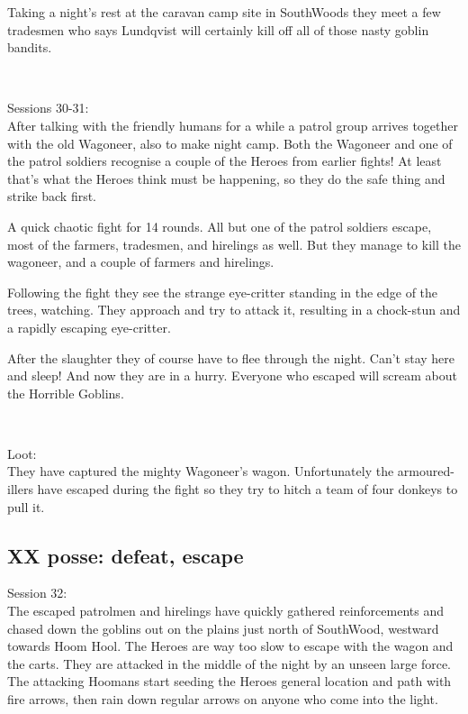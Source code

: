 Taking a night's rest at the caravan camp site in SouthWoods they meet a few tradesmen who says Lundqvist will certainly kill off all of those nasty goblin bandits.

\


Sessions 30-31:\\
After talking with the friendly humans for a while a patrol group arrives together with the old Wagoneer, also to make night camp. Both the Wagoneer and one of the patrol soldiers recognise a couple of the Heroes from earlier fights! At least that's what the Heroes think must be happening, so they do the safe thing and strike back first.

A quick chaotic fight for 14 rounds. All but one of the patrol soldiers escape, most of the farmers, tradesmen, and hirelings as well. But they manage to kill the wagoneer, and a couple of farmers and hirelings.

Following the fight they see the strange eye-critter standing in the edge of the trees, watching. They approach and try to attack it, resulting in a chock-stun and a rapidly escaping eye-critter.

After the slaughter they of course have to flee through the night. Can't stay here and sleep! And now they are in a hurry. Everyone who escaped will scream about the Horrible Goblins.

\

Loot:\\
They have captured the mighty Wagoneer's wagon. Unfortunately the armoured-illers have escaped during the fight so they try to hitch a team of four donkeys to pull it.


\subsection*{XX posse: defeat, escape}

\forceindent Session 32:\\                                              %
The escaped patrolmen and hirelings have quickly gathered reinforcements and chased down the goblins out on the plains just north of SouthWood, westward towards Hoom Hool. The Heroes are way too slow to escape with the wagon and the carts. They are attacked in the middle of the night by an unseen large force. The attacking Hoomans start seeding the Heroes general location and path with fire arrows, then rain down regular arrows on anyone who come into the light.

